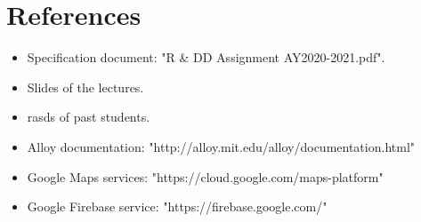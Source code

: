 \chapter{References}

\begin{itemize}
    \item Specification document: "R \& DD Assignment AY2020-2021.pdf".
    \item Slides of the lectures.
    \item \glspl{rasd} of past students.
    \item Alloy documentation: "http://alloy.mit.edu/alloy/documentation.html"
    \item Google Maps services: "https://cloud.google.com/maps-platform"
    \item Google Firebase service: "https://firebase.google.com/"
\end{itemize}
